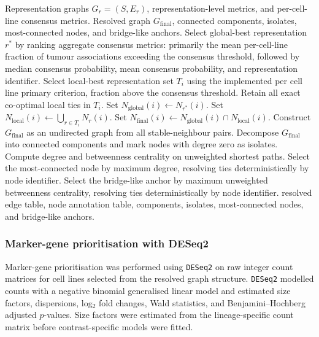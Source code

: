 \begin{algorithm}[!ht]
\caption{Graph-based resolution of patient-referenced cell-line neighbourhoods}
\label{alg:graph_based_consensus_resolution_main}
\small
\begin{algorithmic}[1]
\Require Representation graphs \(G_r=(S,E_r)\), representation-level metrics, and per-cell-line consensus metrics.
\Ensure Resolved graph \(G_{\mathrm{final}}\), connected components, isolates, most-connected nodes, and bridge-like anchors.
\State Select global-best representation \(r^\ast\) by ranking aggregate consensus metrics: primarily the mean per-cell-line fraction of tumour associations exceeding the consensus threshold, followed by median consensus probability, mean consensus probability, and representation identifier.
    \State Select local-best representation set \(T_i\) using the implemented per cell line primary criterion, fraction above the consensus threshold.
    \State Retain all exact co-optimal local ties in \(T_i\).
    \State Set \(N_{\mathrm{global}}(i)\gets N_{r^\ast}(i)\).
    \State Set \(N_{\mathrm{local}}(i)\gets\bigcup_{r\in T_i}N_r(i)\).
    \State Set \(N_{\mathrm{final}}(i)\gets N_{\mathrm{global}}(i)\cap N_{\mathrm{local}}(i)\).
\EndFor
\State Construct \(G_{\mathrm{final}}\) as an undirected graph from all stable-neighbour pairs.
\State Decompose \(G_{\mathrm{final}}\) into connected components and mark nodes with degree zero as isolates.
    \State Compute degree and betweenness centrality on unweighted shortest paths.
    \State Select the most-connected node by maximum degree, resolving ties deterministically by node identifier.
    \State Select the bridge-like anchor by maximum unweighted betweenness centrality, resolving ties deterministically by node identifier.
\EndFor
\State \Return resolved edge table, node annotation table, components, isolates, most-connected nodes, and bridge-like anchors.
\end{algorithmic}
\end{algorithm}

\subsubsection{Marker-gene prioritisation with DESeq2}

Marker-gene prioritisation was performed using \texttt{DESeq2} on raw integer
count matrices for cell lines selected from the resolved graph structure.
\texttt{DESeq2} modelled counts with a negative binomial generalised linear
model and estimated size factors, dispersions, log$_2$ fold changes, Wald
statistics, and Benjamini--Hochberg adjusted $p$-values. Size factors were
estimated from the lineage-specific count matrix before contrast-specific
models were fitted.

